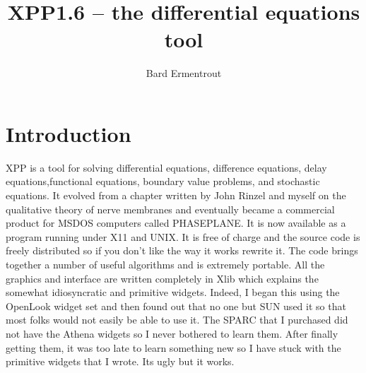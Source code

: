 \newcommand{\beq}{\begin{equation}}
\newcommand{\eeq}{\end{equation}}
\newcommand{\beqa}{\begin{eqnarray}}
\newcommand{\eeqa}{\end{eqnarray}}
\newcommand{\bvb}{\begin{verbatim}}
\newcommand{\evb}{\end{verbatim}}
\newcommand{\beqann}{\begin{eqnarray*}}
\newcommand{\eeqann}{\end{eqnarray*}}
\newcommand{\nn}{\mbox{${\nonumber}$}}
\newcommand{\labeq}[1]{\label{eq:#1}}
\newcommand{\refeq}[1]{(\ref{eq:#1})}
\newcommand{\tc}[1]{\addcontentsline{toc}{subsection}{#1}}
\newcommand{\tcc}[1]{\addcontentsline{toc}{subsubsection}{#1}}
\title{XPP1.6 -- the differential equations tool}
\author{Bard Ermentrout}

\maketitle
\tableofcontents
\newpage
\section{Introduction} XPP  is a tool for solving differential
equations,
 difference 
equations, delay equations,functional equations, boundary value
problems, and stochastic equations. 
 It evolved 
from a chapter written by John Rinzel and myself on the qualitative
 theory of nerve membranes and eventually became a commercial product
 for MSDOS computers called PHASEPLANE.  It is now available as a
program running
 under
 X11 and UNIX.  It is free of charge and the source code is freely
 distributed so if you don't like the way it works rewrite it.  The code 
brings together a number of useful algorithms and is extremely portable. 
 All the graphics and interface are written completely in Xlib which explains 
the somewhat idiosyncratic and primitive widgets.  Indeed, I began this using
 the OpenLook widget set and then found out that no one but SUN used it 
so that most folks would not easily be able to use it.  The SPARC 
that I purchased did not have the Athena widgets so I never bothered 
to learn them.  After finally getting them, it was too late to learn 
something new so I have stuck with the primitive widgets that I wrote. 
 Its ugly but it works.

